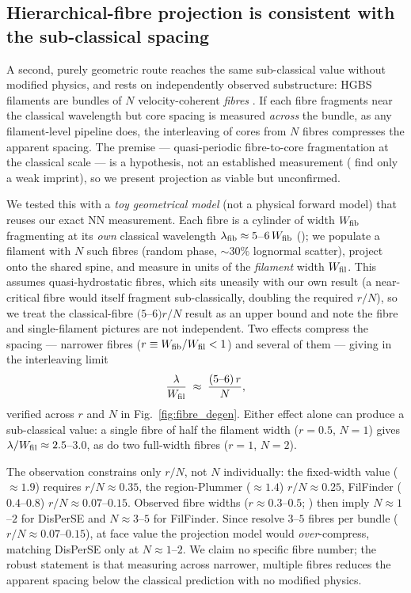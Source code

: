 \documentclass[usenatbib,twoside,twocolumn]{mnras}
\begin{document}
\subsection{Hierarchical-fibre projection is consistent with the sub-classical spacing}
\label{sec:fibre_projection}

A second, purely geometric route reaches the same sub-classical value without modified physics, and rests on independently observed substructure: HGBS filaments are bundles of $N$ velocity-coherent \emph{fibres} \citep{Hacar2013,Hacar2018,Yang2024}. If each fibre fragments near the classical wavelength but core spacing is measured \emph{across} the bundle, as any filament-level pipeline does, the interleaving of cores from $N$ fibres compresses the apparent spacing. The premise --- quasi-periodic fibre-to-core fragmentation at the classical scale --- is a hypothesis, not an established measurement (\citealt{Yang2024} find only a weak imprint), so we present projection as viable but unconfirmed.

We tested this with a \emph{toy geometrical model} (not a physical forward model) that reuses our exact NN measurement. Each fibre is a cylinder of width $W_{\rm fib}$ fragmenting at its \emph{own} classical wavelength $\lambda_{\rm fib}\approx5$--$6\,W_{\rm fib}$ (\citealt{Fischera2012}); we populate a filament with $N$ such fibres (random phase, $\sim30\%$ lognormal scatter), project onto the shared spine, and measure in units of the \emph{filament} width $W_{\rm fil}$. This assumes quasi-hydrostatic fibres, which sits uneasily with our own result (a near-critical fibre would itself fragment sub-classically, doubling the required $r/N$), so we treat the classical-fibre $(5$--$6)r/N$ result as an upper bound and note the fibre and single-filament pictures are not independent. Two effects compress the spacing --- narrower fibres ($r\equiv W_{\rm fib}/W_{\rm fil}<1$) and several of them --- giving in the interleaving limit
\begin{equation}
\frac{\lambda}{W_{\rm fil}} \;\approx\; \frac{(5\text{--}6)\,r}{N},
\label{eq:fourrn}
\end{equation}
verified across $r$ and $N$ in Fig.~\ref{fig:fibre_degen}. Either effect alone can produce a sub-classical value: a single fibre of half the filament width ($r=0.5$, $N=1$) gives $\lambda/W_{\rm fil}\approx2.5$--$3.0$, as do two full-width fibres ($r=1$, $N=2$).

The observation constrains only $r/N$, not $N$ individually: the fixed-width value ($\approx1.9$) requires $r/N\approx0.35$, the region-Plummer ($\approx1.4$) $r/N\approx0.25$, FilFinder ($0.4$--$0.8$) $r/N\approx0.07$--$0.15$. Observed fibre widths ($r\approx0.3$--$0.5$; \citealt{Hacar2013,Hacar2018}) then imply $N\approx1$--$2$ for DisPerSE and $N\approx3$--$5$ for FilFinder. Since \citet{Hacar2013} resolve $3$--$5$ fibres per bundle ($r/N\approx0.07$--$0.15$), at face value the projection model would \emph{over}-compress, matching DisPerSE only at $N\approx1$--$2$. We claim no specific fibre number; the robust statement is that measuring across narrower, multiple fibres reduces the apparent spacing below the classical prediction with no modified physics.
\end{document}

